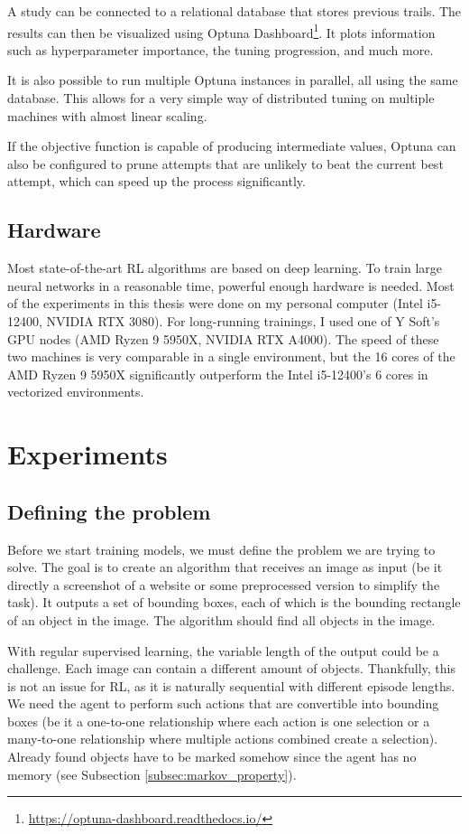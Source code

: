 \documentclass[
  digital,     %
  oneside,     %
  nosansbold,  %
  nocolorbold, %
  lof,         %
  lot,         %
]{fithesis4}
\begin{document}
A study can be connected to a relational database that stores previous trails. The results can then be visualized using Optuna Dashboard\footnote{\url{https://optuna-dashboard.readthedocs.io/}}. It plots information such as hyperparameter importance, the tuning progression, and much more.

It is also possible to run multiple Optuna instances in parallel, all using the same database. This allows for a very simple way of distributed tuning on multiple machines with almost linear scaling.

If the objective function is capable of producing intermediate values, Optuna can also be configured to prune attempts that are unlikely to beat the current best attempt, which can speed up the process significantly.

\section{Hardware}

Most state-of-the-art RL algorithms are based on deep learning. To train large neural networks in a reasonable time, powerful enough hardware is needed. Most of the experiments in this thesis were done on my personal computer (Intel i5-12400, NVIDIA RTX 3080). For long-running trainings, I used one of Y Soft's GPU nodes (AMD Ryzen 9 5950X, NVIDIA RTX A4000). The speed of these two machines is very comparable in a single environment, but the 16 cores of the AMD Ryzen 9 5950X significantly outperform the Intel i5-12400's 6 cores in vectorized environments.

\chapter{Experiments}

\section{Defining the problem}
\label{sec:problem_definition}

Before we start training models, we must define the problem we are trying to solve. The goal is to create an algorithm that receives an image as input (be it directly a screenshot of a website or some preprocessed version to simplify the task). It outputs a set of bounding boxes, each of which is the bounding rectangle of an object in the image. The algorithm should find all objects in the image.

With regular supervised learning, the variable length of the output could be a challenge. Each image can contain a different amount of objects. Thankfully, this is not an issue for RL, as it is naturally sequential with different episode lengths. We need the agent to perform such actions that are convertible into bounding boxes (be it a one-to-one relationship where each action is one selection or a many-to-one relationship where multiple actions combined create a selection). Already found objects have to be marked somehow since the agent has no memory (see Subsection \ref{subsec:markov_property}).
\end{document}
